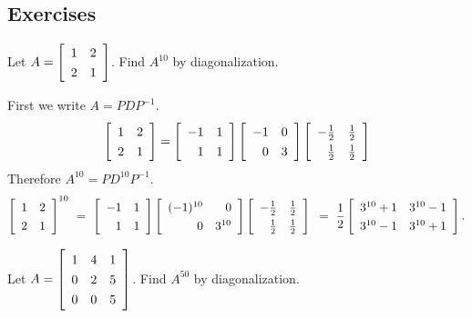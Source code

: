 \documentclass{ximera}
\author{Zack Reed}
\begin{document}
\begin{exercise}

    \section*{Exercises}

    \begin{exercise}
      Let $A = \startmat{rr}
        1 & 2 \\
        2 & 1
      \stopmat$. Find $A^{10}$ by diagonalization.
      \begin{solution}
        First we write $A = PDP^{-1}$.
        \begin{equation*}
          \def\arraystretch{1.3}
          \startmat{rr}
            1 & 2 \\
            2 & 1
          \stopmat
          =
          \startmat{rr}
            -1 & 1 \\
            1 & 1
          \stopmat
          \startmat{rr}
            -1 & 0 \\
            0 & 3
          \stopmat
          \startmat{rr}
            -\frac{1}{2} & \frac{1}{2} \\
            \frac{1}{2} & \frac{1}{2}
          \stopmat
        \end{equation*}
        Therefore $A^{10} = PD^{10}P^{-1}$.
        \begin{equation*}
          \def\arraystretch{1.3}
          \startmat{rr}
            1 & 2 \\
            2 & 1
          \stopmat^{10}
          ~=~
          \startmat{rr}
            -1 & 1 \\
            1 & 1
          \stopmat
          \startmat{rr}
            (-1)^{10} & 0 \\
            0 & 3^{10}
          \stopmat
          \startmat{rr}
            -\frac{1}{2} & \frac{1}{2} \\
            \frac{1}{2} & \frac{1}{2}
          \stopmat \\
          ~=~
          \frac{1}{2}\startmat{cc}
            3^{10}+1 & 3^{10}-1 \\
            3^{10}-1 & 3^{10}+1
          \stopmat.
        \end{equation*}
      \end{solution}
    \end{exercise}
    
    \begin{exercise}
      Let $A = \startmat{rrr}
        1 & 4 & 1 \\
        0 & 2 & 5 \\
        0 & 0 & 5
      \stopmat$. Find $A^{50}$ by diagonalization.
    \end{exercise}
    

\end{exercise}
\end{document}
